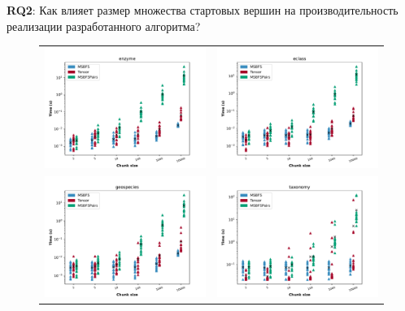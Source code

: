 


\textbf{RQ2}: Как влияет размер множества стартовых вершин на производительность реализации разработанного алгоритма?

\begin{figure}
    \begin{tabular}{cc}
        \includegraphics[width=85mm]{pictures/chunks-enzyme.pdf}     & \includegraphics[width=85mm]{pictures/chunks-eclass.pdf}   \\
        \includegraphics[width=85mm]{pictures/chunks-geospecies.pdf} & \includegraphics[width=85mm]{pictures/chunks-taxonomy.pdf} \\

\end{tabular}
\end{figure}
